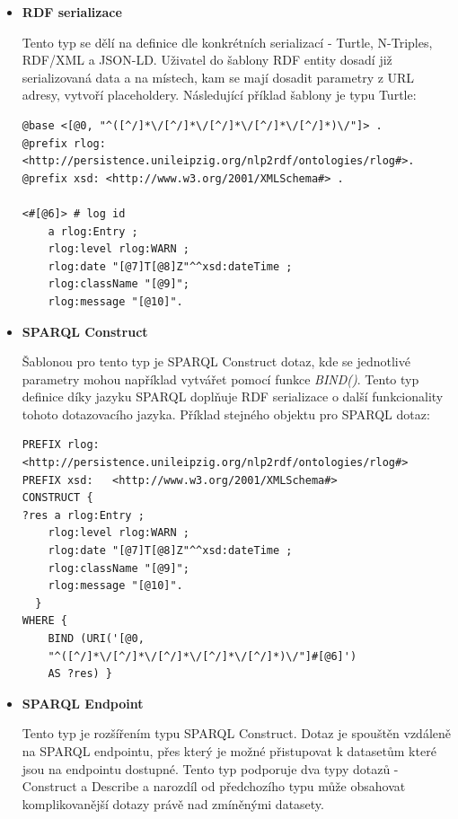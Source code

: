 \documentclass[thesis=B,czech]{FITthesis}[2012/06/26]
\begin{document}
    
    \begin{itemize}
          
    \item \textbf{RDF serializace}   
    
     Tento typ se dělí na definice dle konkrétních serializací - Turtle, N-Triples, RDF/XML a JSON-LD. Uživatel do šablony RDF entity dosadí
     již serializovaná data a na místech, kam se mají dosadit parametry z URL adresy, vytvoří placeholdery.
     Následující příklad šablony je typu Turtle:
     
     \begin{lstlisting}[float=htb,caption={Šablona RDF entity v Turtle formátu},label=list:spage]
@base <[@0, "^([^/]*\/[^/]*\/[^/]*\/[^/]*\/[^/]*)\/"]> .
@prefix rlog: 
<http://persistence.unileipzig.org/nlp2rdf/ontologies/rlog#>.
@prefix xsd: <http://www.w3.org/2001/XMLSchema#> .

<#[@6]> # log id 
	a rlog:Entry ;
  	rlog:level rlog:WARN ;
	rlog:date "[@7]T[@8]Z"^^xsd:dateTime ;
	rlog:className "[@9]";
	rlog:message "[@10]".
\end{lstlisting}
 
    \item \textbf{SPARQL Construct}
    
      Šablonou pro tento typ je SPARQL Construct dotaz, kde se jednotlivé parametry mohou například vytvářet pomocí funkce \textit{BIND()}.
      Tento typ definice díky jazyku 
      SPARQL doplňuje RDF serializace o další funkcionality tohoto dotazovacího jazyka.
      Příklad stejného objektu pro SPARQL dotaz:
      
      
           \begin{lstlisting}[float=htb,caption={Šablona SPARQL dotazu},label=list:spage]
PREFIX rlog:  
<http://persistence.unileipzig.org/nlp2rdf/ontologies/rlog#>
PREFIX xsd:   <http://www.w3.org/2001/XMLSchema#>
CONSTRUCT { 
?res a rlog:Entry ;
  	rlog:level rlog:WARN ;
	rlog:date "[@7]T[@8]Z"^^xsd:dateTime ;
	rlog:className "[@9]";
	rlog:message "[@10]".
  }
WHERE {
    BIND (URI('[@0, 
    "^([^/]*\/[^/]*\/[^/]*\/[^/]*\/[^/]*)\/"]#[@6]')
    AS ?res) }
\end{lstlisting}
      
      
    \item \textbf{SPARQL Endpoint}
    
      Tento typ je rozšířením typu SPARQL Construct. Dotaz je spouštěn vzdáleně na SPARQL endpointu, přes který je možné přistupovat k datasetům které jsou
      na endpointu dostupné. Tento typ podporuje dva typy dotazů - Construct a Describe a narozdíl od předchozího typu může obsahovat komplikovanější
      dotazy právě nad zmíněnými datasety.
      

\end{itemize}
\end{document}
